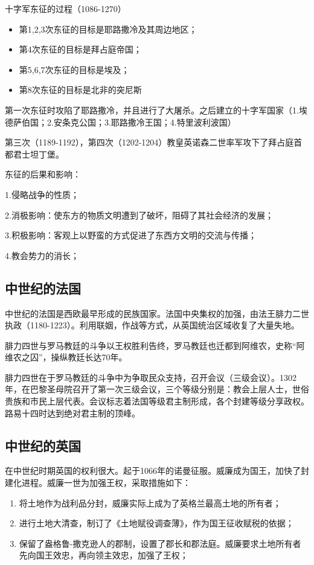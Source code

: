 十字军东征的过程（1086-1270）

\begin{itemize}
    \item 第1,2,3次东征的目标是耶路撒冷及其周边地区；
    \item 第4次东征的目标是拜占庭帝国；
    \item 第5,6,7次东征的目标是埃及；
    \item 第8次东征的目标是北非的突尼斯
\end{itemize}

第一次东征时攻陷了耶路撒冷，并且进行了大屠杀。之后建立的十字军国家（1.埃德萨伯国；2.安条克公国；3.耶路撒冷王国；4.特里波利波国）

第三次（1189-1192），第四次（1202-1204）教皇英诺森二世率军攻下了拜占庭首都君士坦丁堡。

东征的后果和影响：

1.侵略战争的性质；

2.消极影响：使东方的物质文明遭到了破坏，阻碍了其社会经济的发展；

3.积极影响：客观上以野蛮的方式促进了东西方文明的交流与传播；

4.教会势力的消长；

\subsection{中世纪的法国}
中世纪的法国是西欧最早形成的民族国家。法国中央集权的加强，由法王腓力二世执政（1180-1223）。利用联姻，作战等方式，从英国统治区域收复了大量失地。

腓力四世与罗马教廷的斗争以王权胜利告终，罗马教廷也迁都到阿维农，史称“阿维农之囚”，操纵教廷长达70年。

腓力四世在于罗马教廷的斗争中为争取民众支持，召开会议（三级会议）。1302年，在巴黎圣母院召开了第一次三级会议，三个等级分别是：教会上层人士，世俗贵族和市民上层代表。会议标志着法国等级君主制形成，各个封建等级分享政权。路易十四时达到绝对君主制的顶峰。

\subsection{中世纪的英国}
在中世纪时期英国的权利很大。起于1066年的诺曼征服。威廉成为国王，加快了封建化进程。威廉一世为加强王权，采取措施如下：

\begin{enumerate}
    \item 将土地作为战利品分封，威廉实际上成为了英格兰最高土地的所有者；
    \item 进行土地大清查，制订了《土地赋役调查薄》，作为国王征收赋税的依据；
    \item 保留了盎格鲁-撒克逊人的郡制，设置了郡长和郡法庭。威廉要求土地所有者先向国王效忠，再向领主效忠，加强了王权；
\end{enumerate}
	
